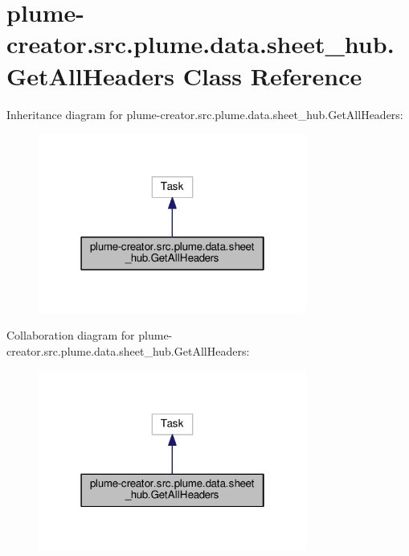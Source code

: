 \hypertarget{classplume-creator_1_1src_1_1plume_1_1data_1_1sheet__hub_1_1_get_all_headers}{}\section{plume-\/creator.src.\+plume.\+data.\+sheet\+\_\+hub.\+Get\+All\+Headers Class Reference}
\label{classplume-creator_1_1src_1_1plume_1_1data_1_1sheet__hub_1_1_get_all_headers}


Inheritance diagram for plume-\/creator.src.\+plume.\+data.\+sheet\+\_\+hub.\+Get\+All\+Headers\+:\nopagebreak
\begin{figure}[H]
\begin{center}
\leavevmode
\includegraphics[width=250pt]{classplume-creator_1_1src_1_1plume_1_1data_1_1sheet__hub_1_1_get_all_headers__inherit__graph}
\end{center}
\end{figure}


Collaboration diagram for plume-\/creator.src.\+plume.\+data.\+sheet\+\_\+hub.\+Get\+All\+Headers\+:\nopagebreak
\begin{figure}[H]
\begin{center}
\leavevmode
\includegraphics[width=250pt]{classplume-creator_1_1src_1_1plume_1_1data_1_1sheet__hub_1_1_get_all_headers__coll__graph}
\end{center}
\end{figure}
